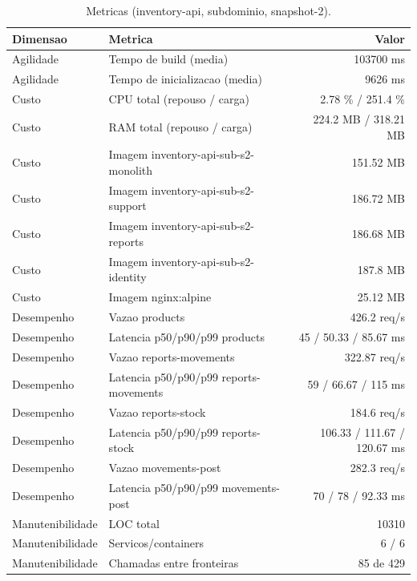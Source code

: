 \begin{table}[htb]
  \centering
  \caption{Metricas (inventory-api, subdominio, snapshot-2).}
  \label{tab:metricas-inventory-api-subdominio-snapshot-2}
  \begin{tabular}{llr}
    \hline
    \textbf{Dimensao} & \textbf{Metrica} & \textbf{Valor} \\
    \hline
    Agilidade & Tempo de build (media) & 103700 ms \\
    Agilidade & Tempo de inicializacao (media) & 9626 ms \\
    Custo & CPU total (repouso / carga) & 2.78 \% / 251.4 \% \\
    Custo & RAM total (repouso / carga) & 224.2 MB / 318.21 MB \\
    Custo & Imagem inventory-api-sub-s2-monolith & 151.52 MB \\
    Custo & Imagem inventory-api-sub-s2-support & 186.72 MB \\
    Custo & Imagem inventory-api-sub-s2-reports & 186.68 MB \\
    Custo & Imagem inventory-api-sub-s2-identity & 187.8 MB \\
    Custo & Imagem nginx:alpine & 25.12 MB \\
    Desempenho & Vazao products & 426.2 req/s \\
    Desempenho & Latencia p50/p90/p99 products & 45 / 50.33 / 85.67 ms \\
    Desempenho & Vazao reports-movements & 322.87 req/s \\
    Desempenho & Latencia p50/p90/p99 reports-movements & 59 / 66.67 / 115 ms \\
    Desempenho & Vazao reports-stock & 184.6 req/s \\
    Desempenho & Latencia p50/p90/p99 reports-stock & 106.33 / 111.67 / 120.67 ms \\
    Desempenho & Vazao movements-post & 282.3 req/s \\
    Desempenho & Latencia p50/p90/p99 movements-post & 70 / 78 / 92.33 ms \\
    Manutenibilidade & LOC total & 10310 \\
    Manutenibilidade & Servicos/containers & 6 / 6 \\
    Manutenibilidade & Chamadas entre fronteiras & 85 de 429 \\
    \hline
  \end{tabular}
\end{table}
